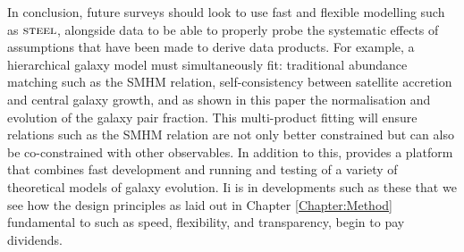 In conclusion, future surveys should look to use fast and flexible modelling such as $\textsc{steel}$, alongside data to be able to properly probe the systematic effects of assumptions that have been made to derive data products. For example, a hierarchical galaxy model must simultaneously fit: traditional abundance matching such as the SMHM relation, self-consistency between satellite accretion and central galaxy growth, and as shown in this paper the normalisation and evolution of the galaxy pair fraction. This multi-product fitting will ensure relations such as the SMHM relation are not only better constrained but can also be co-constrained with other observables. In addition to this, \steel provides a platform that combines fast development and running and testing of a variety of theoretical models of galaxy evolution. Ii is in developments such as these that we see how the design principles as laid out in Chapter \ref{Chapter:Method} fundamental to \steel such as speed, flexibility, and transparency, begin to pay dividends.
